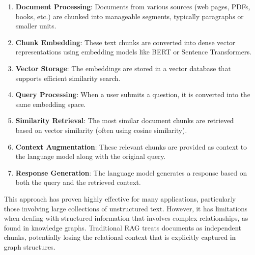 \begin{enumerate}
    \item \textbf{Document Processing}: Documents from various sources (web pages, PDFs, books, etc.) are chunked into manageable segments, typically paragraphs or smaller units.
    
    \item \textbf{Chunk Embedding}: These text chunks are converted into dense vector representations using embedding models like BERT or Sentence Transformers.
    
    \item \textbf{Vector Storage}: The embeddings are stored in a vector database that supports efficient similarity search.
    
    \item \textbf{Query Processing}: When a user submits a question, it is converted into the same embedding space.
    
    \item \textbf{Similarity Retrieval}: The most similar document chunks are retrieved based on vector similarity (often using cosine similarity).
    
    \item \textbf{Context Augmentation}: These relevant chunks are provided as context to the language model along with the original query.
    
    \item \textbf{Response Generation}: The language model generates a response based on both the query and the retrieved context.
\end{enumerate}

This approach has proven highly effective for many applications, particularly those involving large collections of unstructured text. However, it has limitations when dealing with structured information that involves complex relationships, as found in knowledge graphs. Traditional RAG treats documents as independent chunks, potentially losing the relational context that is explicitly captured in graph structures.

